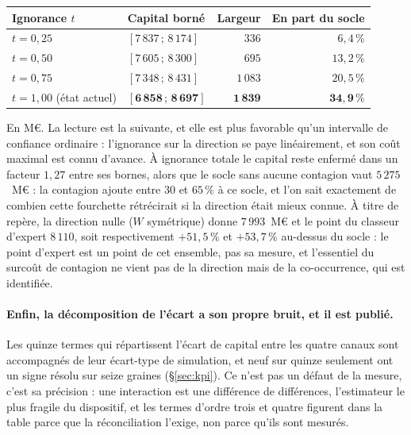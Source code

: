 \begin{center}\footnotesize
\renewcommand{\arraystretch}{1.25}
\begin{tabular}{@{}l l r r@{}}
\toprule
\textbf{Ignorance $t$} & \textbf{Capital borné} & \textbf{Largeur} & \textbf{En part du socle} \\
\midrule
$t=0{,}25$ & $[7\,837\,;\,8\,174]$ & $336$ & $6{,}4\,\%$ \\
$t=0{,}50$ & $[7\,605\,;\,8\,300]$ & $695$ & $13{,}2\,\%$ \\
$t=0{,}75$ & $[7\,348\,;\,8\,431]$ & $1\,083$ & $20{,}5\,\%$ \\
$t=1{,}00$ (état actuel) & $[\mathbf{6\,858}\,;\,\mathbf{8\,697}]$ & $\mathbf{1\,839}$ & $\mathbf{34{,}9}\,\%$ \\
\bottomrule
\end{tabular}
\end{center}

\vspace{4pt}
\noindent En M\euro. La lecture est la suivante, et elle est plus favorable qu'un intervalle de
confiance ordinaire : l'ignorance sur la direction se paye linéairement, et son coût
maximal est connu d'avance. À ignorance totale le capital reste enfermé dans un facteur
$1{,}27$ entre ses bornes, alors que le socle sans aucune contagion vaut $5\,275$~M\euro{} : la
contagion ajoute entre $30$ et $65\,\%$ à ce socle, et l'on sait exactement de combien cette
fourchette rétrécirait si la direction était mieux connue. À titre de repère, la direction nulle
($W$ symétrique) donne $7\,993$~M\euro{} et le point du classeur d'expert $8\,110$, soit
respectivement $+51{,}5\,\%$ et $+53{,}7\,\%$ au-dessus du socle : le point d'expert
est un point de cet ensemble, pas sa mesure, et l'essentiel du surcoût de contagion ne vient pas
de la direction mais de la co-occurrence, qui est identifiée.

\paragraph{Enfin, la décomposition de l'écart a son propre bruit, et il est publié.} Les quinze
termes qui répartissent l'écart de capital entre les quatre canaux sont accompagnés de leur
écart-type de simulation, et neuf sur quinze seulement ont un signe résolu sur seize
graines (\S\ref{sec:kpi}). Ce n'est pas un défaut de la mesure, c'est sa précision : une
interaction est une différence de différences, l'estimateur le plus fragile du dispositif, et
les termes d'ordre trois et quatre figurent dans la table parce que la réconciliation l'exige,
non parce qu'ils sont mesurés.

